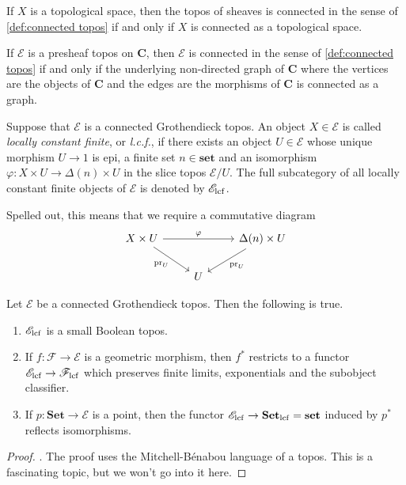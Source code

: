 If $X$ is a topological space, then the topos of sheaves is connected in the sense of \cref{def:connected topos} if and only if $X$ is connected as a topological space.

If $\mathscr{E}$ is a presheaf topos on $\mathbf{C}$, then $\mathscr{E}$ is connected in the sense of \cref{def:connected topos} if and only if the underlying non-directed graph of $\mathbf{C}$ where the vertices are the objects of $\mathbf{C}$ and the edges are the morphisms of $\mathbf{C}$ is connected as a graph.

\begin{definition}
\label{def:locally constant finite}
Suppose that $\mathscr{E}$ is a connected Grothendieck topos. An object $X \in \mathscr{E}$ is called   \emph{locally constant finite}, or \emph{l.c.f.}, if there exists an object $U \in \mathscr{E}$ whose unique morphism $U \to 1$ is epi, a finite set $n \in \mathbf{set}$ and an isomorphism $\varphi : X \times U \to \Delta(n) \times U$ in the slice topos $\mathscr{E}/U$. The full subcategory of all locally constant finite objects of $\mathscr{E}$ is denoted by $\mathscr{E}_{\operatorname{lcf}}$.
\end{definition}
Spelled out, this means that we require a commutative diagram
\[ \begin{tikzcd}
X \times U \arrow{rr}{\varphi} \arrow[swap]{dr}{\pr_U} & & \Delta(n) \times U \arrow{dl}{\pr_U} \\
& U &
\end{tikzcd} \]

\begin{proposition}
\label{prop:standard LCF properties for the LCF topos}
Let $\mathscr{E}$ be a connected Grothendieck topos. Then the following is true.
\begin{enumerate}
	\item $\mathscr{E}_{\operatorname{lcf}}$ is a small Boolean topos.
	\item If $f : \mathscr{F} \to \mathscr{E}$ is a geometric morphism, then $f^*$ restricts to a functor $\mathscr{E}_{\operatorname{lcf}} \to \mathscr{F}_{\operatorname{lcf}}$ which preserves finite limits, exponentials and the subobject classifier.
	\item If $p : \mathbf{Set} \to \mathscr{E}$ is a point, then the functor $\mathscr{E}_{\operatorname{lcf}} \to \mathbf{Set}_{\operatorname{lcf}} = \mathbf{set}$ induced by $p^*$ reflects isomorphisms.
\end{enumerate}
\end{proposition}
\begin{proof}
\cite[Proposition 8.42]{johnstone77}. The proof uses the Mitchell-B\'enabou language of a topos. This is a fascinating topic, but we won't go into it here.
\end{proof}

